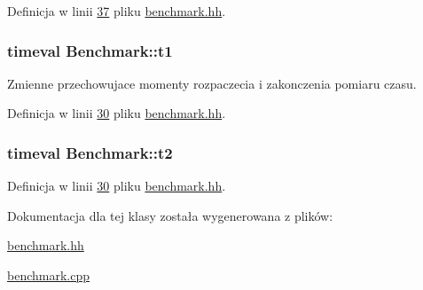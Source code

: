 Definicja w linii \hyperlink{benchmark_8hh_source_l00037}{37} pliku \hyperlink{benchmark_8hh_source}{benchmark.\-hh}.

\hypertarget{class_benchmark_ab951e55dc4470926e0eb0761804f13bc}{
\subsubsection[{t1}]{\setlength{\rightskip}{0pt plus 5cm}timeval Benchmark\-::t1\hspace{0.3cm}{\ttfamily [private]}}}\label{class_benchmark_ab951e55dc4470926e0eb0761804f13bc}
Zmienne przechowujace momenty rozpaczecia i zakonczenia pomiaru czasu. 

Definicja w linii \hyperlink{benchmark_8hh_source_l00030}{30} pliku \hyperlink{benchmark_8hh_source}{benchmark.\-hh}.

\hypertarget{class_benchmark_a2b145dd2458fea33d6df41f310058bec}{
\subsubsection[{t2}]{\setlength{\rightskip}{0pt plus 5cm}timeval Benchmark\-::t2\hspace{0.3cm}{\ttfamily [private]}}}\label{class_benchmark_a2b145dd2458fea33d6df41f310058bec}


Definicja w linii \hyperlink{benchmark_8hh_source_l00030}{30} pliku \hyperlink{benchmark_8hh_source}{benchmark.\-hh}.



Dokumentacja dla tej klasy została wygenerowana z plików\-:\begin{DoxyCompactItemize}
\item 
\hyperlink{benchmark_8hh}{benchmark.\-hh}\item 
\hyperlink{benchmark_8cpp}{benchmark.\-cpp}\end{DoxyCompactItemize}
